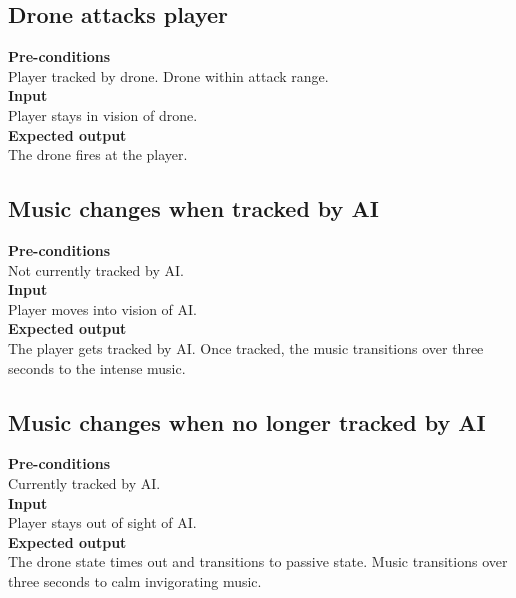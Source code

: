 \documentclass[a4paper,10pt]{article}
\begin{document}
    \subsection{Drone attacks player}
    \textbf{Pre-conditions}\\
    Player tracked by drone. Drone within attack range.
    \smallskip\\\textbf{Input}\\
    Player stays in vision of drone.
    \smallskip\\\textbf{Expected output}\\
    The drone fires at the player.    
    
    \subsection{Music changes when tracked by AI}
    \textbf{Pre-conditions}\\
    Not currently tracked by AI.
    \smallskip\\\textbf{Input}\\
    Player moves into vision of AI.
    \smallskip\\\textbf{Expected output}\\
    The player gets tracked by AI. Once tracked, the music transitions over three seconds to the intense music.
    
    \subsection{Music changes when no longer tracked by AI}
    \textbf{Pre-conditions}\\
    Currently tracked by AI.
    \smallskip\\\textbf{Input}\\
    Player stays out of sight of AI.
    \smallskip\\\textbf{Expected output}\\
    The drone state times out and transitions to passive state. Music transitions over three seconds to calm invigorating music.
        
\end{document}
